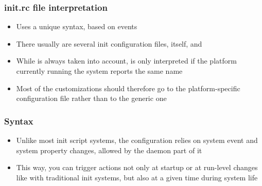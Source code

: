 \begin{frame}
  \frametitle{init.rc file interpretation}
  \begin{itemize}
  \item Uses a unique syntax, based on events
  \item There usually are several init configuration files,
     itself, and 
  \item While  is always taken into account,
     is only interpreted if the platform
    currently running the system reports the same name
  \item Most of the customizations should therefore go to the
    platform-specific configuration file rather than to the generic
    one
  \end{itemize}
\end{frame}

\begin{frame}
  \frametitle{Syntax}
  \begin{itemize}
  \item Unlike most init script systems, the configuration relies on
    system event and system property changes, allowed by the
    daemon part of it
  \item This way, you can trigger actions not only at startup or at
    run-level changes like with traditional init systems, but also at
    a given time during system life
  \end{itemize}
\end{frame}

